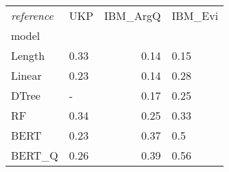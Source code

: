 \begin{tabular}{llrl}
\toprule
\textit{reference} &   UKP &  IBM\_ArgQ & IBM\_Evi \\
model  &       &           &         \\
\midrule
Length &  0.33 &      0.14 &    0.15 \\
Linear &  0.23 &      0.14 &    0.28 \\
DTree  &     - &      0.17 &    0.25 \\
RF     &  0.34 &      0.25 &    0.33 \\
BERT   &  0.23 &      0.37 &     0.5 \\
BERT\_Q &  0.26 &      0.39 &    0.56 \\
\bottomrule
\end{tabular}

